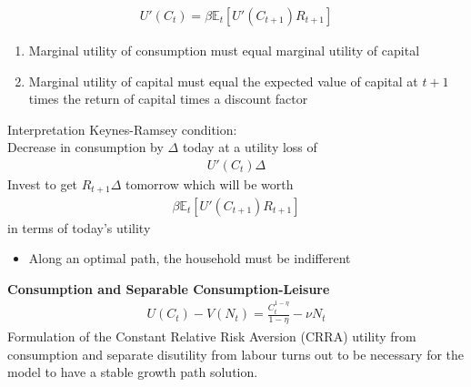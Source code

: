 \documentclass{beamer}
\begin{document}
\begin{frame}
\begin{align*}
  U'(C_t)= \beta \mathbb{E}_t[U'(C_{t+1})R_{t+1}]
\end{align*}
\begin{enumerate}
  \item Marginal utility of consumption must equal marginal utility of capital
  \item Marginal utility of capital must equal the expected value of capital at $t+1$ times the return of capital times a discount factor
\end{enumerate}
\end{frame}

\begin{frame}
 Interpretation Keynes-Ramsey condition:\\
  Decrease in consumption by $\Delta$ today at a utility loss of 
 \begin{align*}
    U'(C_t)\Delta
  \end{align*} 
  Invest to get $R_{t+1}\Delta$ tomorrow which will be worth
 \begin{align*}
  \beta \mathbb{E}_t[U'(C_{t+1})R_{t+1}]
 \end{align*}
 in terms of today's utility
 \begin{itemize}
   \item Along an optimal path, the household must be indifferent 
 \end{itemize}
\end{frame}

\begin{frame}
  \textbf{Consumption and Separable Consumption-Leisure}\\
  \begin{align}
  U(C_t)-V(N_t)=\frac{C_t^{1-\eta}}{1-\eta}-\nu N_t
  \end{align}
  Formulation of the Constant Relative Risk Aversion (CRRA) utility from consumption and separate disutility from labour turns out to be necessary for the model to have a stable growth path solution.
\end{frame}
\end{document}
